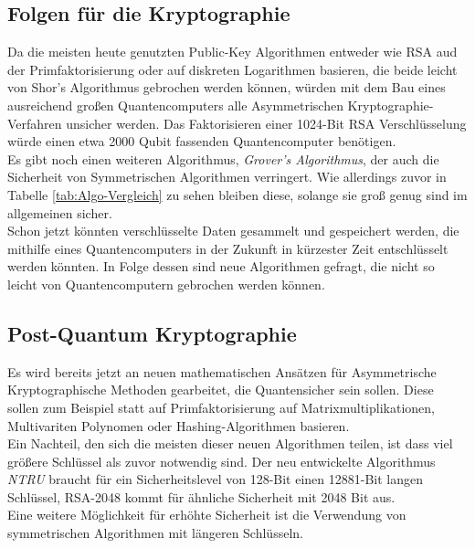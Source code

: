 \documentclass[12pt]{IEEEtran}
\begin{document}
\subsection{Folgen für die Kryptographie}

Da die meisten heute genutzten Public-Key Algorithmen entweder wie RSA aud der Primfaktorisierung oder auf diskreten Logarithmen basieren, die beide leicht von Shor's Algorithmus gebrochen werden können, würden mit dem Bau eines ausreichend großen Quantencomputers alle Asymmetrischen Kryptographie-Verfahren unsicher werden. Das Faktorisieren einer 1024-Bit RSA Verschlüsselung würde einen etwa 2000 Qubit fassenden Quantencomputer benötigen. \\

Es gibt noch einen weiteren Algorithmus, \textit{Grover's Algorithmus}, der auch die Sicherheit von Symmetrischen Algorithmen verringert. Wie allerdings zuvor in Tabelle \ref{tab:Algo-Vergleich} zu sehen bleiben diese, solange sie groß genug sind im allgemeinen sicher. \cite{mavroeidis2018impact} \\

Schon jetzt könnten verschlüsselte Daten gesammelt und gespeichert werden, die mithilfe eines Quantencomputers in der Zukunft in kürzester Zeit entschlüsselt werden könnten. In Folge dessen sind neue Algorithmen gefragt, die nicht so leicht von Quantencomputern gebrochen werden können.

\subsection{Post-Quantum Kryptographie}

Es wird bereits jetzt an neuen mathematischen Ansätzen für Asymmetrische Kryptographische Methoden gearbeitet, die Quantensicher sein sollen. Diese sollen zum Beispiel statt auf Primfaktorisierung auf Matrixmultiplikationen, Multivariten Polynomen oder Hashing-Algorithmen basieren. \cite{mavroeidis2018impact} \\

Ein Nachteil, den sich die meisten dieser neuen Algorithmen teilen, ist dass viel größere Schlüssel als zuvor notwendig sind. Der neu entwickelte Algorithmus \textit{NTRU} braucht für ein Sicherheitslevel von 128-Bit einen 12881-Bit langen Schlüssel, RSA-2048 kommt für ähnliche Sicherheit mit 2048 Bit aus. \\
Eine weitere Möglichkeit für erhöhte Sicherheit ist die Verwendung von symmetrischen Algorithmen mit längeren Schlüsseln. \\
\end{document}
